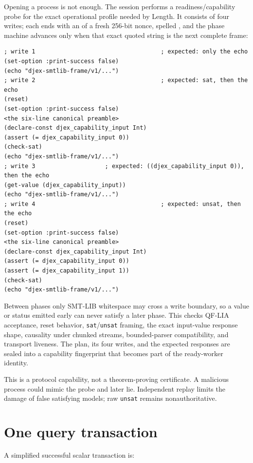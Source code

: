 \documentclass[10pt,letterpaper,oneside]{report}
\newcommand{\code}[1]{\texttt{\detokenize{#1}}}
\newcommand{\sat}{\texttt{sat}}
\newcommand{\unsat}{\texttt{unsat}}
\begin{document}
Opening a process is not enough. The session performs a readiness/capability probe for the exact operational profile needed by Length. It consists of four writes; each ends with an \code{echo} of a fresh 256-bit nonce, spelled \code{(echo "djex-smtlib-frame/v1/<64 hex digits>")}, and the phase machine advances only when that exact quoted string is the next complete frame:

\begin{lstlisting}[language=SMTLib,caption={The four readiness writes and the responses they require (barrier nonces abbreviated).}]
; write 1                                    ; expected: only the echo
(set-option :print-success false)
(echo "djex-smtlib-frame/v1/...")
; write 2                                    ; expected: sat, then the echo
(reset)
(set-option :print-success false)
<the six-line canonical preamble>
(declare-const djex_capability_input Int)
(assert (= djex_capability_input 0))
(check-sat)
(echo "djex-smtlib-frame/v1/...")
; write 3                    ; expected: ((djex_capability_input 0)), then the echo
(get-value (djex_capability_input))
(echo "djex-smtlib-frame/v1/...")
; write 4                                    ; expected: unsat, then the echo
(reset)
(set-option :print-success false)
<the six-line canonical preamble>
(declare-const djex_capability_input Int)
(assert (= djex_capability_input 0))
(assert (= djex_capability_input 1))
(check-sat)
(echo "djex-smtlib-frame/v1/...")
\end{lstlisting}

Between phases only SMT-LIB whitespace may cross a write boundary, so a value or status emitted early can never satisfy a later phase. This checks QF-LIA acceptance, reset behavior, \sat/\unsat{} framing, the exact input-value response shape, causality under chunked streams, bounded-parser compatibility, and transport liveness. The plan, its four writes, and the expected responses are sealed into a capability fingerprint that becomes part of the ready-worker identity.

This is a protocol capability, not a theorem-proving certificate. A malicious process could mimic the probe and later lie. Independent replay limits the damage of false satisfying models; raw \unsat{} remains nonauthoritative.

\section{One query transaction}

A simplified successful scalar transaction is:
\end{document}
